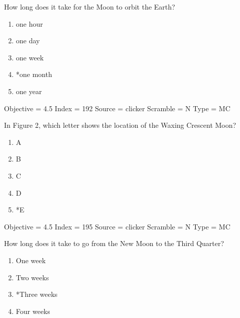 \documentclass[11pt]{article}
\begin{document}
\begin{enumerate}
\begin{minipage}{\textwidth}
\begin{minipage}{\textwidth}
\item How long does it take for the Moon to orbit the Earth?
\begin{multicols}{3}
\begin{enumerate} 
\setlength{\itemsep}{1pt} 
\setlength{\parskip}{0pt} 
\setlength{\parsep}{0pt}
\setlength{\multicolsep}{1pt} 
\item one hour
\item one day
\item one week
\item *one month
\item one year
\end{enumerate} 
\vfill 
\end{multicols}

Objective = 4.5
Index = 192
Source = clicker
Scramble = N
Type = MC
\end{minipage}
\end{minipage}
\vskip 0.20in

\begin{minipage}{\textwidth}
\begin{minipage}{\textwidth}
\item In Figure 2, which letter shows the location of the Waxing Crescent Moon?
\begin{multicols}{3}
\begin{enumerate} 
\setlength{\itemsep}{1pt} 
\setlength{\parskip}{0pt} 
\setlength{\parsep}{0pt}
\setlength{\multicolsep}{1pt} 
\item A
\item B
\item C
\item D
\item *E
\end{enumerate} 
\vfill 
\end{multicols}

Objective = 4.5
Index = 195
Source = clicker
Scramble = N
Type = MC
\end{minipage}
\end{minipage}
\vskip 0.20in

\begin{minipage}{\textwidth}
\begin{minipage}{\textwidth}
\item How long does it take to go from the New Moon to the Third Quarter?
\begin{multicols}{3}
\begin{enumerate} 
\setlength{\itemsep}{1pt} 
\setlength{\parskip}{0pt} 
\setlength{\parsep}{0pt}
\setlength{\multicolsep}{1pt} 
\item One week
\item Two weeks
\item *Three weeks
\item Four weeks
\end{enumerate} 
\vfill 
\end{multicols}


\end{minipage}
\end{minipage}
\end{enumerate}
\end{document}
